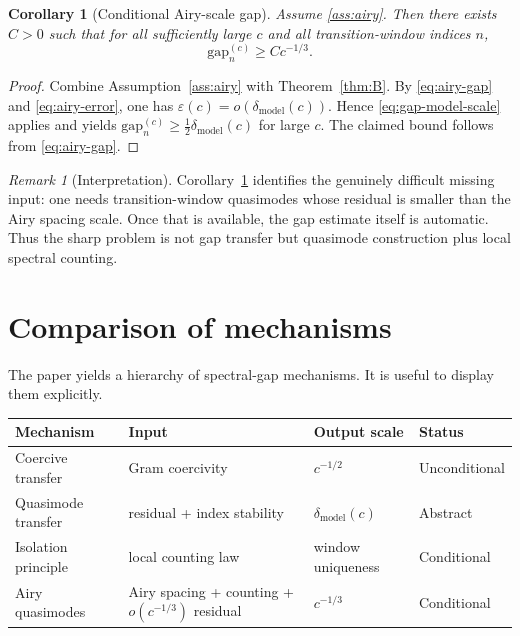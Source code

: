 \documentclass[12pt,a4paper]{amsart}
\newtheorem{corollary}[theorem]{Corollary}
\theoremstyle{definition}
\theoremstyle{remark}
\newtheorem{remark}[theorem]{Remark}
\newcommand{\gapc}[2]{\mathrm{gap}_{#2}^{(#1)}}
\begin{document}
\begin{corollary}[Conditional Airy-scale gap]
\label{cor:airy}
Assume \ref{ass:airy}.
Then there exists $C>0$ such that for all sufficiently large $c$ and all
transition-window indices $n$,
\begin{equation}\label{eq:airy-conclusion}
  \gapc{c}{n} \ge C c^{-1/3}.
\end{equation}
\end{corollary}

\begin{proof}
Combine Assumption~\ref{ass:airy} with Theorem~\ref{thm:B}.
By \eqref{eq:airy-gap} and \eqref{eq:airy-error}, one has
$\varepsilon(c)=o(\delta_{\mathrm{model}}(c))$.
Hence \eqref{eq:gap-model-scale} applies and yields
$\gapc{c}{n}\ge \tfrac12\delta_{\mathrm{model}}(c)$ for large $c$.
The claimed bound follows from \eqref{eq:airy-gap}.
\end{proof}

\begin{remark}[Interpretation]
Corollary~\ref{cor:airy} identifies the genuinely difficult missing input:
one needs transition-window quasimodes whose residual is smaller than the
Airy spacing scale.
Once that is available, the gap estimate itself is automatic.
Thus the sharp problem is not gap transfer but quasimode construction plus
local spectral counting.
\end{remark}

\section{Comparison of mechanisms}
\label{sec:comparison}

The paper yields a hierarchy of spectral-gap mechanisms.
It is useful to display them explicitly.

\begin{center}
\renewcommand{\arraystretch}{1.3}
\begin{tabular}{llll}
\toprule
Mechanism & Input & Output scale & Status \\
\midrule
Coercive transfer & Gram coercivity & $c^{-1/2}$ & Unconditional \\
Quasimode transfer & residual + index stability & $\delta_{\mathrm{model}}(c)$ & Abstract \\
Isolation principle & local counting law & window uniqueness & Conditional \\
Airy quasimodes & Airy spacing + counting + $o(c^{-1/3})$ residual & $c^{-1/3}$ & Conditional \\
\bottomrule
\end{tabular}
\end{center}
\end{document}

